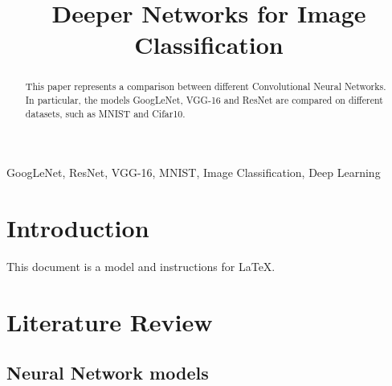 \documentclass[conference]{IEEEtran}
\begin{document}
\title{Deeper Networks for Image Classification}

\author{
}

\maketitle

\begin{abstract}
This paper represents a comparison between different Convolutional Neural Networks. In particular, the models GoogLeNet, VGG-16 and ResNet are compared on different datasets, such as MNIST and Cifar10.
\end{abstract}

\begin{IEEEkeywords}
GoogLeNet, ResNet, VGG-16, MNIST, Image Classification, Deep Learning
\end{IEEEkeywords}

\section{Introduction}
This document is a model and instructions for \LaTeX.

\section{Literature Review}

\subsection{Neural Network models}
\end{document}
